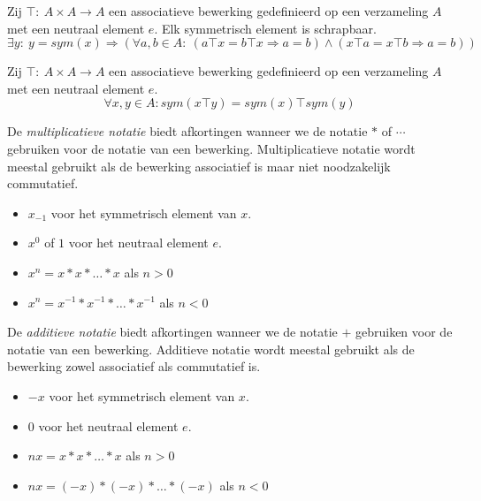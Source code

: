 \documentclass[main.tex]{subfiles}
\begin{document}
\begin{st}
  Zij $\top:\ A\times A\rightarrow A$ een associatieve bewerking gedefinieerd op een verzameling $A$ met een neutraal element $e$.
  Elk symmetrisch element is schrapbaar.
  \[ \exists y:\ y = sym(x) \Rightarrow (\forall a,b \in A:\ (a\top x = b \top x \Rightarrow a = b) \wedge( x\top a = x \top b \Rightarrow a = b)) \]

\end{st}

\begin{st}
  Zij $\top:\ A\times A\rightarrow A$ een associatieve bewerking gedefinieerd op een verzameling $A$ met een neutraal element $e$.
  \[ \forall x, y \in A: sym(x\top y) = sym(x) \top sym(y) \]

\end{st}


\begin{de}
  De \emph{multiplicatieve notatie} biedt afkortingen wanneer we de notatie $*$ of $\cdots$ gebruiken voor de notatie van een bewerking.
  Multiplicatieve notatie wordt meestal gebruikt als de bewerking associatief is maar niet noodzakelijk commutatief.
  \begin{itemize}
  \item $x_{-1}$ voor het symmetrisch element van $x$.
  \item $x^{0}$ of $1$ voor het neutraal element $e$.
  \item $x^{n} = x * x * \dotsc * x$ als $n > 0$
  \item $x^{n} = x^{-1} * x^{-1} * \dotsc * x^{-1}$ als $n < 0$
  \end{itemize}
\end{de}

\begin{de}
  De \emph{additieve notatie} biedt afkortingen wanneer we de notatie $+$ gebruiken voor de notatie van een bewerking.
  Additieve notatie wordt meestal gebruikt als de bewerking zowel associatief als commutatief is.
  \begin{itemize}
  \item $-x$ voor het symmetrisch element van $x$.
  \item $0$ voor het neutraal element $e$.
  \item $nx = x * x * \dotsc * x$ als $n > 0$
  \item $nx = (-x) * (-x) * \dotsc * (-x)$ als $n < 0$
  \end{itemize}
\end{de}
\end{document}

